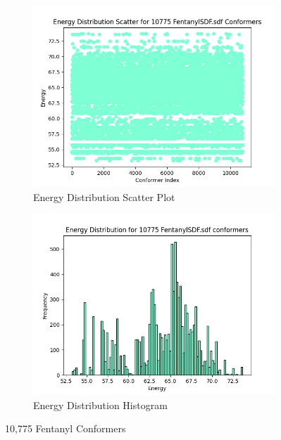 \documentclass[a4paper,10pt]{article}
\begin{document}
\begin{figure}[H]
    \centering
    \begin{subfigure}{0.45\textwidth}
        \centering
        \includegraphics[width=\linewidth]{imgs/FentanylSDF_Energy_Scatter.png}
        \caption{Energy Distribution Scatter Plot}
        \label{fig:image1}
    \end{subfigure}
    \hfill
    \begin{subfigure}{0.45\textwidth}
        \centering
        \includegraphics[width=\linewidth]{imgs/FentanylSDF_Energy_Histogram.png}
        \caption{Energy Distribution Histogram}
        \label{fig:image2}
    \end{subfigure}
    \caption{10,775 Fentanyl Conformers}
    \label{fig:comparison}
\end{figure}
\end{document}
